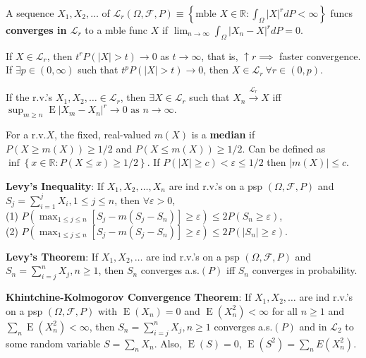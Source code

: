 \documentclass[paper=letter,fontsize=2.89mm]{scrartcl}
\DeclareMathOperator{\E}{E}
\newcommand{\convL}[1]{\stackrel{\mathcal{L}_{#1}}{\longrightarrow}}
\newcommand{\eps}{\varepsilon}
\newcommand{\R}{\mathbb{R}}
\newcommand\abs[1]{\left| #1 \right|}
\newcommand\set[1]{\left\{ #1 \right\}}
\begin{document}
\begin{multicols*}{3}
A sequence $X_1, X_2, \dots$ of 
$\mathcal{L}_r(\Omega, \mathcal{F}, P) \equiv \set{\text{mble } X \in \R: \int_\Omega \abs{X}^r dP < \infty}$
funcs \textbf{converges in $\mathcal{L}_r$} to a mble func $X$ if 
$\lim_{n\to\infty} \int_\Omega \abs{X_n - X}^r dP = 0.$ \\ \medskip

If $X \in \mathcal{L}_r$, then $t^r P(\abs{X} > t) \to 0$ as $t \to \infty$, that is, $\uparrow r \implies$ faster convergence. If $\exists p \in (0,\infty)$ such that $t^p P(\abs{X} > t) \to 0$, then $X \in \mathcal{L}_r ~\forall r \in (0, p)$. \\\medskip

If the r.v.\@'s $X_1, X_2, \dots \in \mathcal{L}_r$, then $\exists X \in \mathcal{L}_r$ such that $X_n \convL{r} X$ iff $\sup_{m\ge n} \E\abs{X_m-X_n}^r \to 0 \text{ as } n \to \infty.$ \\ \medskip

For a r.v.\@ $X$, the fixed, real-valued $m(X)$ is a \textbf{median} if $P(X \ge m(X)) \ge 1/2$ and $P(X \le m(X)) \ge 1/2$. Can be defined as $\inf\set{x \in \R: P(X \le x) \ge 1/2}$. If $P(\abs{X} \ge c) < \eps \le 1/2$ then $\abs{m(X)} \le c$. \\\medskip

\textbf{Levy's Inequality}: If $X_1, X_2, \dots, X_n$ are ind r.v.\@'s on a psp $(\Omega, \mathcal{F}, P)$ and $S_j = \sum_{i=1}^j X_i, 1 \le j \le n$, then $\forall \eps > 0$, \\
(1) $P\left( \max_{1\le j \le n}\left[ S_j - m(S_j-S_n)\right] \ge \eps\right) \le 2P(S_n \ge \eps)$, \\
(2) $P\left( \max_{1\le j \le n}\left[ S_j - m(S_j-S_n)\right] \ge \eps\right) \le 2P(\abs{S_n} \ge \eps)$. \\ \medskip

\textbf{Levy's Theorem}: If $X_1, X_2, \dots$ are ind r.v.\@'s on a psp $(\Omega, \mathcal{F}, P)$ and  $S_n = \sum_{i=j}^n X_j, n\ge1$, then $S_n$ converges a.s.$(P)$ iff $S_n$ converges in probability. \\\medskip

\textbf{Khintchine-Kolmogorov Convergence Theorem}: If $X_1, X_2, \dots$ are ind r.v.\@'s on a psp $(\Omega, \mathcal{F}, P)$ with $\E(X_n) = 0$ and $\E(X_n^2) < \infty$ for all $n \ge 1$ and $\sum_n \E(X_n^2) < \infty$, then $S_n=\sum_{i=j}^n X_j, n\ge1$ converges a.s.$(P)$ and in $\mathcal{L}_2$ to some random variable $S = \sum_n X_n$. Also, $\E(S) = 0$, $\E(S^2) = \sum_n E(X_n^2)$. \\\medskip


\end{multicols*}
\end{document}
